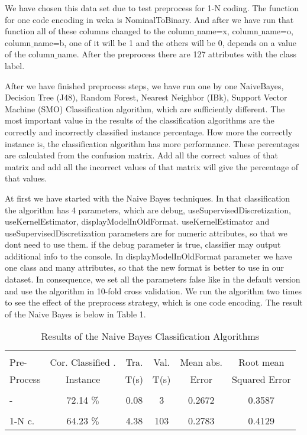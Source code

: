 \documentclass[a4paper]{article}
\begin{document}
We have chosen this data set due to test preprocess for 1-N coding. The function for one code encoding in weka is NominalToBinary. And after we have run that function all of these columns changed to the column$\_$name=x, column$\_$name=o, column$\_$name=b, one of it will be 1 and the others will be 0, depends on a value of the column$\_$name. After the preprocess there are 127 attributes with the class label. 

After we have finished preprocess steps, we have run one by one NaiveBayes, Decision Tree (J48), Random Forest, Nearest Neighbor (IBk), Support Vector Machine (SMO) Classification algorithm, which are sufficiently different. The most important value in the results of the classification algorithms are the correctly and incorrectly classified instance percentage. How more the correctly instance is, the classification algorithm has more performance. These percentages are calculated from the confusion matrix. Add all the correct values of that matrix and add all the incorrect values of that matrix will give the percentage of that values. 

At first we have started with the Naive Bayes techniques. In that classification the algorithm has 4 parameters, which are debug, useSupervisedDiscretization, useKernelEstimator, displayModelInOldFormat. useKernelEstimator and useSupervisedDiscretization parameters are for numeric attributes, so that we dont need to use them. if the debug parameter is true, classifier may output additional info to the console. In displayModelInOldFormat parameter we have one class and many attributes, so that the new format is better to use in our dataset. In consequence, we set all the parameters false like in the default version and use the algorithm in 10-fold cross validation. We run the algorithm two times to see the effect of the preprocess strategy, which is one code encoding. The result of the Naive Bayes is below in Table 1.

\begin{table}
\begin{tabular}{|l| c | c | c |c |c |}

\hline & & & & & \\
Pre- & Cor. Classified . & Tra. & Val. & Mean abs.  & Root mean \\
Process & Instance & T(s) &  T(s) & Error & Squared Error \\
\hline & & & & & \\
- &72.14  $\%$ & 0.08 & 3 &  0.2672 & 0.3587 \\ 
\hline & & & & & \\
1-N c. &64.23  $\%$ & 4.38 & 103 & 0.2783 & 0.4129 \\ 
\hline
\end{tabular}
\caption{Results of the Naive Bayes Classification Algorithms}
\end{table}
\end{document}
